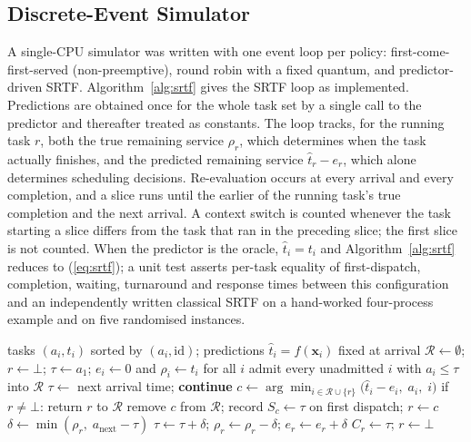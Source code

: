 \documentclass[conference]{IEEEtran}
\begin{document}
\subsection{Discrete-Event Simulator}
A single-CPU simulator was written with one event loop per policy:
first-come-first-served (non-preemptive), round robin with a fixed quantum,
and predictor-driven SRTF. Algorithm~\ref{alg:srtf} gives the SRTF loop as
implemented. Predictions are obtained once for the whole task set by a single
call to the predictor and thereafter treated as constants. The loop tracks,
for the running task $r$, both the true remaining service $\rho_r$, which
determines when the task actually finishes, and the predicted remaining
service $\hat{t}_r - e_r$, which alone determines scheduling decisions.
Re-evaluation occurs at every arrival and every completion, and a slice runs
until the earlier of the running task's true completion and the next
arrival. A context switch is counted whenever the task starting a slice
differs from the task that ran in the preceding slice; the first slice is not
counted. When the predictor is the oracle, $\hat{t}_i = t_i$ and
Algorithm~\ref{alg:srtf} reduces to (\ref{eq:srtf}); a unit test asserts
per-task equality of first-dispatch, completion, waiting, turnaround and
response times between this configuration and an independently written
classical SRTF on a hand-worked four-process example and on five randomised
instances.

\begin{algorithm}[t]
\caption{Predictor-driven SRTF on a single CPU (as implemented)}
\label{alg:srtf}
\begin{algorithmic}[1]
\REQUIRE tasks $(a_i, t_i)$ sorted by $(a_i, \text{id})$; predictions $\hat{t}_i = f(\mathbf{x}_i)$ fixed at arrival
\STATE $\mathcal{R} \leftarrow \emptyset$; $r \leftarrow \bot$; $\tau \leftarrow a_1$; $e_i \leftarrow 0$ and $\rho_i \leftarrow t_i$ for all $i$
  \STATE admit every unadmitted $i$ with $a_i \le \tau$ into $\mathcal{R}$
    \STATE $\tau \leftarrow$ next arrival time; \textbf{continue}
  \ENDIF
  \STATE $c \leftarrow \arg\min_{i \in \mathcal{R} \cup \{r\}} \bigl(\hat{t}_i - e_i,\; a_i,\; i\bigr)$ 
    \STATE if $r \ne \bot$: return $r$ to $\mathcal{R}$
    \STATE remove $c$ from $\mathcal{R}$; record $S_c \leftarrow \tau$ on first dispatch; $r \leftarrow c$
  \ENDIF
  \STATE $\delta \leftarrow \min(\rho_r,\; a_{\mathrm{next}} - \tau)$
  \STATE $\tau \leftarrow \tau + \delta$; $\rho_r \leftarrow \rho_r - \delta$; $e_r \leftarrow e_r + \delta$
    \STATE $C_r \leftarrow \tau$; $r \leftarrow \bot$
  \ENDIF
\ENDWHILE
\end{algorithmic}
\end{algorithm}
\end{document}
